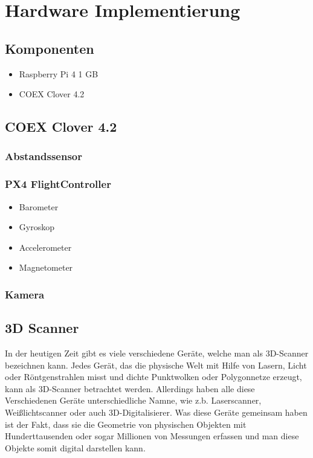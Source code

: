 \chapter{Hardware Implementierung}

\section{Komponenten}

\begin{itemize}
    \item{Raspberry Pi 4 1 GB}
    \item{COEX Clover 4.2}
\end{itemize}

\section{COEX Clover 4.2}

\subsection{Abstandssensor}

\subsection{PX4 FlightController}

\begin{itemize}
    \item{Barometer}
    \item{Gyroskop}
    \item{Accelerometer}
    \item{Magnetometer}
\end{itemize}

\subsection{Kamera}

\section{3D Scanner}
In der heutigen Zeit gibt es viele verschiedene Geräte, welche man als 3D-Scanner bezeichnen kann. Jedes Gerät, das die physische Welt mit Hilfe von Lasern, Licht oder Röntgenstrahlen misst und dichte Punktwolken oder Polygonnetze erzeugt, kann als 3D-Scanner betrachtet werden. Allerdings haben alle diese Verschiedenen Geräte unterschiedliche Namne, wie z.b. Laserscanner, Weißlichtscanner oder auch 3D-Digitalisierer. Was diese Geräte gemeinsam haben ist der Fakt, dass sie die Geometrie von physischen Objekten mit Hunderttausenden oder sogar Millionen von Messungen erfassen und man diese Objekte somit digital darstellen kann.

